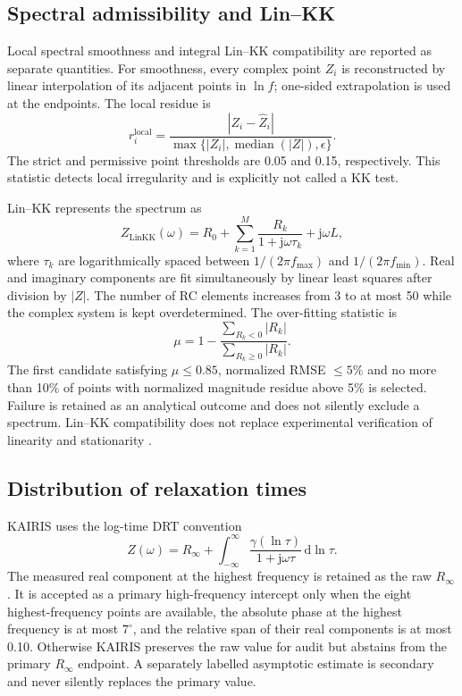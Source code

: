 \documentclass[a4paper,fleqn]{cas-sc}
\begin{document}
\subsection{Spectral admissibility and Lin--KK}\label{sec:linkk}

Local spectral smoothness and integral Lin--KK compatibility are reported as
separate quantities. For smoothness, every complex point $Z_i$ is reconstructed
by linear interpolation of its adjacent points in $\ln f$; one-sided
extrapolation is used at the endpoints. The local residue is
\begin{equation}
 r_i^{\mathrm{local}} =
 \frac{|Z_i-\widehat Z_i|}
 {\max\{|Z_i|,\operatorname{median}(|Z|),\epsilon\}}.
\end{equation}
The strict and permissive point thresholds are 0.05 and 0.15, respectively.
This statistic detects local irregularity and is explicitly not called a KK
test.

Lin--KK represents the spectrum as \cite{Schonleber2014LinKK}
\begin{equation}
 Z_{\mathrm{LinKK}}(\omega)=R_0+
 \sum_{k=1}^{M}\frac{R_k}{1+\mathrm{j}\omega\tau_k}
 +\mathrm{j}\omega L,
 \label{eq:linkk}
\end{equation}
where $\tau_k$ are logarithmically spaced between
$1/(2\pi f_{\max})$ and $1/(2\pi f_{\min})$. Real and imaginary components are
fit simultaneously by linear least squares after division by $|Z|$. The number
of RC elements increases from 3 to at most 50 while the complex system is kept
overdetermined. The over-fitting statistic is
\begin{equation}
 \mu=1-\frac{\sum_{R_k<0}|R_k|}{\sum_{R_k\geq 0}|R_k|}.
\end{equation}
The first candidate satisfying $\mu\leq0.85$, normalized RMSE $\leq5\%$ and no
more than 10\% of points with normalized magnitude residue above 5\% is selected.
Failure is retained as an analytical outcome and does not silently exclude a
spectrum. Lin--KK compatibility does not replace experimental verification of
linearity and stationarity \cite{Wang2021EIS,Boukamp2025Guidance}.

\subsection{Distribution of relaxation times}\label{sec:drt}

KAIRIS uses the log-time DRT convention
\begin{equation}
 Z(\omega)=R_\infty+
 \int_{-\infty}^{\infty}
 \frac{\gamma(\ln\tau)}{1+\mathrm{j}\omega\tau}\,\mathrm{d}\ln\tau.
 \label{eq:drt}
\end{equation}
The measured real component at the highest frequency is retained as the raw
$R_\infty$. It is accepted as a primary high-frequency intercept only when the
eight highest-frequency points are available, the absolute phase at the highest
frequency is at most $7^{\circ}$, and the relative span of their real components
is at most 0.10. Otherwise KAIRIS preserves the raw value for audit but abstains
from the primary $R_\infty$ endpoint. A separately labelled asymptotic estimate
is secondary and never silently replaces the primary value.
\end{document}
